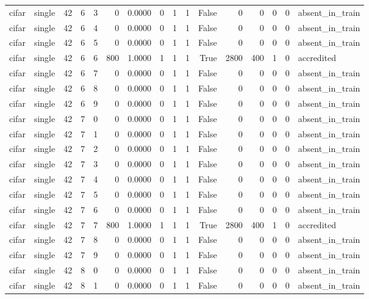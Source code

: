 \begin{tabular}{llrrrrrrrrrrrrrl}
cifar & single & 42 & 6 & 3 & 0 & 0.0000 & 0 & 1 & 1 & False & 0 & 0 & 0 & 0 & absent\_in\_train \\
cifar & single & 42 & 6 & 4 & 0 & 0.0000 & 0 & 1 & 1 & False & 0 & 0 & 0 & 0 & absent\_in\_train \\
cifar & single & 42 & 6 & 5 & 0 & 0.0000 & 0 & 1 & 1 & False & 0 & 0 & 0 & 0 & absent\_in\_train \\
cifar & single & 42 & 6 & 6 & 800 & 1.0000 & 1 & 1 & 1 & True & 2800 & 400 & 1 & 0 & accredited \\
cifar & single & 42 & 6 & 7 & 0 & 0.0000 & 0 & 1 & 1 & False & 0 & 0 & 0 & 0 & absent\_in\_train \\
cifar & single & 42 & 6 & 8 & 0 & 0.0000 & 0 & 1 & 1 & False & 0 & 0 & 0 & 0 & absent\_in\_train \\
cifar & single & 42 & 6 & 9 & 0 & 0.0000 & 0 & 1 & 1 & False & 0 & 0 & 0 & 0 & absent\_in\_train \\
cifar & single & 42 & 7 & 0 & 0 & 0.0000 & 0 & 1 & 1 & False & 0 & 0 & 0 & 0 & absent\_in\_train \\
cifar & single & 42 & 7 & 1 & 0 & 0.0000 & 0 & 1 & 1 & False & 0 & 0 & 0 & 0 & absent\_in\_train \\
cifar & single & 42 & 7 & 2 & 0 & 0.0000 & 0 & 1 & 1 & False & 0 & 0 & 0 & 0 & absent\_in\_train \\
cifar & single & 42 & 7 & 3 & 0 & 0.0000 & 0 & 1 & 1 & False & 0 & 0 & 0 & 0 & absent\_in\_train \\
cifar & single & 42 & 7 & 4 & 0 & 0.0000 & 0 & 1 & 1 & False & 0 & 0 & 0 & 0 & absent\_in\_train \\
cifar & single & 42 & 7 & 5 & 0 & 0.0000 & 0 & 1 & 1 & False & 0 & 0 & 0 & 0 & absent\_in\_train \\
cifar & single & 42 & 7 & 6 & 0 & 0.0000 & 0 & 1 & 1 & False & 0 & 0 & 0 & 0 & absent\_in\_train \\
cifar & single & 42 & 7 & 7 & 800 & 1.0000 & 1 & 1 & 1 & True & 2800 & 400 & 1 & 0 & accredited \\
cifar & single & 42 & 7 & 8 & 0 & 0.0000 & 0 & 1 & 1 & False & 0 & 0 & 0 & 0 & absent\_in\_train \\
cifar & single & 42 & 7 & 9 & 0 & 0.0000 & 0 & 1 & 1 & False & 0 & 0 & 0 & 0 & absent\_in\_train \\
cifar & single & 42 & 8 & 0 & 0 & 0.0000 & 0 & 1 & 1 & False & 0 & 0 & 0 & 0 & absent\_in\_train \\
cifar & single & 42 & 8 & 1 & 0 & 0.0000 & 0 & 1 & 1 & False & 0 & 0 & 0 & 0 & absent\_in\_train \\

\end{tabular}
